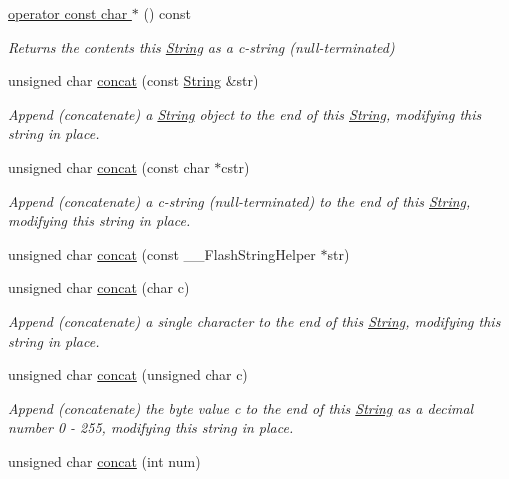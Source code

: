 \begin{DoxyCompactItemize}
\item 
\hyperlink{class_string_a9a12caedc885ac44c86d104a8cb60f82}{operator const char $\ast$} () const
\begin{DoxyCompactList}\small\item\em Returns the contents this \hyperlink{class_string}{String} as a c-\/string (null-\/terminated) \end{DoxyCompactList}\item 
unsigned char \hyperlink{class_string_a63f64f8a3da37d4570ce7b2ceec5bd2b}{concat} (const \hyperlink{class_string}{String} \&str)
\begin{DoxyCompactList}\small\item\em Append (concatenate) a \hyperlink{class_string}{String} object to the end of this \hyperlink{class_string}{String}, modifying this string in place. \end{DoxyCompactList}\item 
unsigned char \hyperlink{class_string_a5477edc378d55f57bb6572217e562c7a}{concat} (const char $\ast$cstr)
\begin{DoxyCompactList}\small\item\em Append (concatenate) a c-\/string (null-\/terminated) to the end of this \hyperlink{class_string}{String}, modifying this string in place. \end{DoxyCompactList}\item 
unsigned char \hyperlink{class_string_a09dd174078f7d0b1552b249949cfd96c}{concat} (const \+\_\+\+\_\+\+Flash\+String\+Helper $\ast$str)
\item 
unsigned char \hyperlink{class_string_a5f3e286a1a7b65a154e3e3dd19d4b707}{concat} (char c)
\begin{DoxyCompactList}\small\item\em Append (concatenate) a single character to the end of this \hyperlink{class_string}{String}, modifying this string in place. \end{DoxyCompactList}\item 
unsigned char \hyperlink{class_string_a1c02b2de34a3245d16c5430951789f7d}{concat} (unsigned char c)
\begin{DoxyCompactList}\small\item\em Append (concatenate) the byte value c to the end of this \hyperlink{class_string}{String} as a decimal number 0 -\/ 255, modifying this string in place. \end{DoxyCompactList}\item 
unsigned char \hyperlink{class_string_a6d437a7312b591848b5457705fee5549}{concat} (int num)

\end{DoxyCompactItemize}
